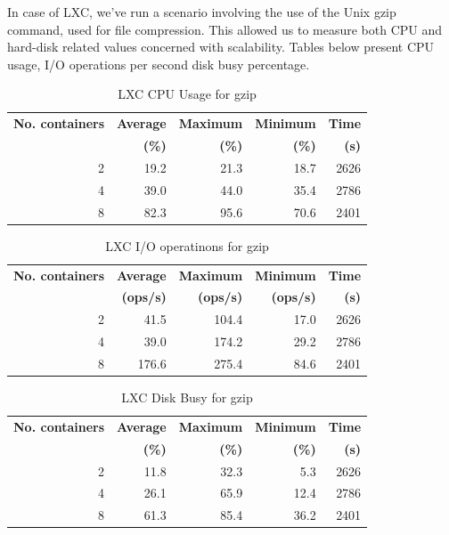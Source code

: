 In case of LXC, we've run a scenario involving the use of the Unix gzip
command, used for file compression. This allowed us to measure both CPU and
hard-disk related values concerned with scalability. Tables below present CPU
usage, I/O operations per second disk busy percentage.

\begin{table}[ht]
  \centering
  \begin{tabular}{@{}rrrrr@{}}
    \toprule
    \textbf{No. containers} & \textbf{Average} & \textbf{Maximum} &
    \textbf{Minimum} & \textbf{Time} \\
    & \textbf{(\%)} & \textbf{(\%)} & \textbf{(\%)} &\textbf{(s)} \\
    \midrule
    2 & 19.2 & 21.3 & 18.7 & 2626 \\
    4 & 39.0 & 44.0 & 35.4 & 2786 \\
    8 & 82.3 & 95.6 & 70.6 & 2401 \\
    \bottomrule
  \end{tabular}
  \caption{LXC CPU Usage for gzip}
  \label{table:virt-infra:lxc-cpu}
\end{table}

\begin{table}[ht]
  \centering
  \begin{tabular}{@{}rrrrr@{}}
    \toprule
    \textbf{No. containers} & \textbf{Average} & \textbf{Maximum} &
    \textbf{Minimum} & \textbf{Time} \\
    & \textbf{(ops/s)} & \textbf{(ops/s)} & \textbf{(ops/s)} &\textbf{(s)} \\
    \midrule
    2 & 41.5 & 104.4 & 17.0 & 2626 \\
    4 & 39.0 & 174.2 & 29.2 & 2786 \\
    8 & 176.6 & 275.4 & 84.6 & 2401 \\
    \bottomrule
  \end{tabular}
  \caption{LXC I/O operatinons for gzip}
  \label{table:virt-infra:lxc-io}
\end{table}

\begin{table}[ht]
  \centering
  \begin{tabular}{@{}rrrrr@{}}
    \toprule
    \textbf{No. containers} & \textbf{Average} & \textbf{Maximum} &
    \textbf{Minimum} & \textbf{Time} \\
    & \textbf{(\%)} & \textbf{(\%)} & \textbf{(\%)} &\textbf{(s)} \\
    \midrule
    2 & 11.8 & 32.3 & 5.3 & 2626 \\
    4 & 26.1 & 65.9 & 12.4 & 2786 \\
    8 & 61.3 & 85.4 & 36.2 & 2401 \\
    \bottomrule
  \end{tabular}
  \caption{LXC Disk Busy for gzip}
  \label{table:virt-infra:lxc-disk}
\end{table}

